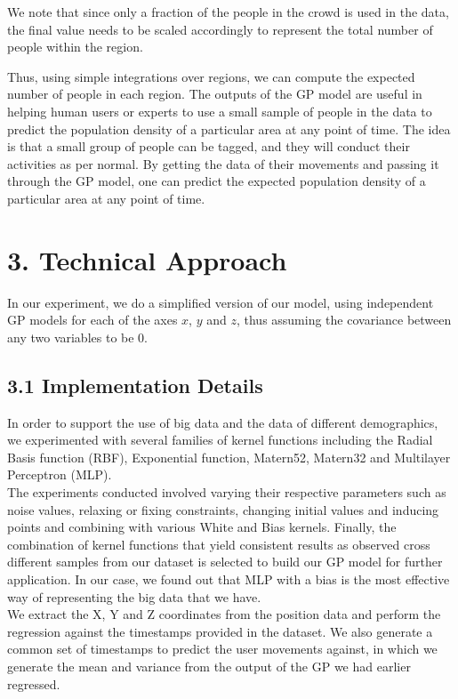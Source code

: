 \documentclass[letterpaper]{article}
\begin{document}
We note that since only a fraction of the people in the crowd is used in the data, the final value needs to be scaled accordingly to represent the total number of people within the region.

Thus, using simple integrations over regions, we can compute the expected number of people in each region. The outputs of the GP model are useful in helping human users or experts to use a small sample of people in the data to predict the population density of a particular area at any point of time. The idea is that a small group of people can be tagged, and they will conduct their activities as per normal. By getting the data of their movements and passing it through the GP model, one can predict the expected population density of a particular area at any point of time.

\section{3.  Technical Approach}

In our experiment, we do a simplified version of our model, using independent GP models for each of the axes $x$, $y$ and $z$, thus assuming the covariance between any two variables to be $0$. 

\subsection{3.1  Implementation Details}

In order to support the use of big data and the data of different demographics, we experimented with several families of kernel functions including the Radial Basis function (RBF), Exponential function, Matern52, Matern32 and Multilayer Perceptron (MLP).\\

The experiments conducted involved varying their respective parameters such as noise values, relaxing or fixing constraints, changing initial values and inducing points and combining with various White and Bias kernels. Finally, the combination of kernel functions that yield consistent results as observed cross different samples from our dataset is selected to build our GP model for further application. In our case, we found out that MLP with a bias is the most effective way of representing the big data that we have.\\

We extract the X, Y and Z coordinates from the position data and perform the regression against the timestamps provided in the dataset. We also generate a common set of timestamps to predict the user movements against, in which we generate the mean and variance from the output of the GP we had earlier regressed. \\
\end{document}
